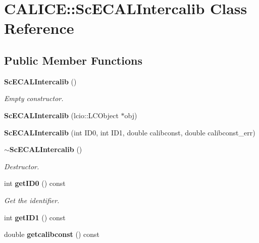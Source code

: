 \section{CALICE::ScECALIntercalib Class Reference}
\label{classCALICE_1_1ScECALIntercalib}
\subsection*{Public Member Functions}
\begin{DoxyCompactItemize}
\item 
{\bf ScECALIntercalib} ()\label{classCALICE_1_1ScECALIntercalib_ab9a903d872bc35e9cdfc4c4a8a5a134d}

\begin{DoxyCompactList}\small\item\em Empty constructor. \item\end{DoxyCompactList}\item 
{\bfseries ScECALIntercalib} (lcio::LCObject $\ast$obj)\label{classCALICE_1_1ScECALIntercalib_ad302212d0d7491ed08afcf3708490beb}

\item 
{\bfseries ScECALIntercalib} (int ID0, int ID1, double calibconst, double calibconst\_\-err)\label{classCALICE_1_1ScECALIntercalib_ac1abf38ae2b90662ffd06d452cdad3b3}

\item 
{\bf $\sim$ScECALIntercalib} ()\label{classCALICE_1_1ScECALIntercalib_a8997a10c987868dfbf62c1716bcfefe2}

\begin{DoxyCompactList}\small\item\em Destructor. \item\end{DoxyCompactList}\item 
int {\bf getID0} () const \label{classCALICE_1_1ScECALIntercalib_a2c7ed7983127492a1cac7e089b654545}

\begin{DoxyCompactList}\small\item\em Get the identifier. \item\end{DoxyCompactList}\item 
int {\bfseries getID1} () const \label{classCALICE_1_1ScECALIntercalib_a007d4db7c51419e050350189d8ad3f2b}

\item 
double {\bf getcalibconst} () const \label{classCALICE_1_1ScECALIntercalib_af366c4fbf475af5d858f3df7c159ec61}


\end{DoxyCompactItemize}
